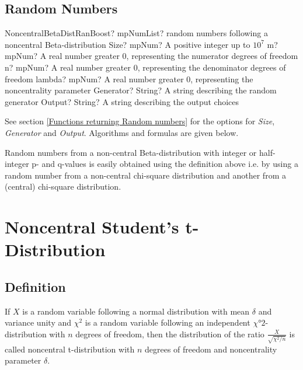 \subsection{Random Numbers}

\begin{mpFunctionsExtract}
	\mpFunctionSixNotImplemented
	{NoncentralBetaDistRanBoost? mpNumList? random numbers following a noncentral Beta-distribution}
	{Size? mpNum? A positive integer up to $10^7$}
	{m? mpNum? A real number greater 0, representing the numerator  degrees of freedom}
	{n? mpNum? A real number greater 0, representing the denominator degrees of freedom}
	{lambda? mpNum? A real number greater 0, representing the noncentrality parameter}
	{Generator? String? A string describing the random generator}
	{Output? String? A string describing the output choices}
\end{mpFunctionsExtract}

\vspace{0.3cm}
See section \ref{Functions returning Random numbers} for the options for  {\itshape\sffamily Size},  {\itshape\sffamily Generator} and {\itshape\sffamily Output}. Algorithms and formulas are given below.

\vspace{0.3cm}
Random numbers from a non-central Beta-distribution with integer or half-integer p- and q-values is easily obtained using the definition above i.e. by using a random number from a non-central chi-square distribution and another from a (central) chi-square distribution.





\newpage
\section{Noncentral Student's t-Distribution}
\label{NoncentraltDistributionBoost}


\subsection{Definition}
\label{NoncentraltDistributionDefinitionBoost}


If $X$ is a random variable following a normal distribution with mean $\delta$ and variance unity and $\chi^2$ is a random variable following an independent $\chi°2$-distribution with $n$ degrees of freedom, 
then the distribution of the ratio $\frac{X}{\sqrt{\chi^2 / n}}$ is called noncentral t-distribution with $n$ degrees of freedom and noncentrality parameter $\delta$.



